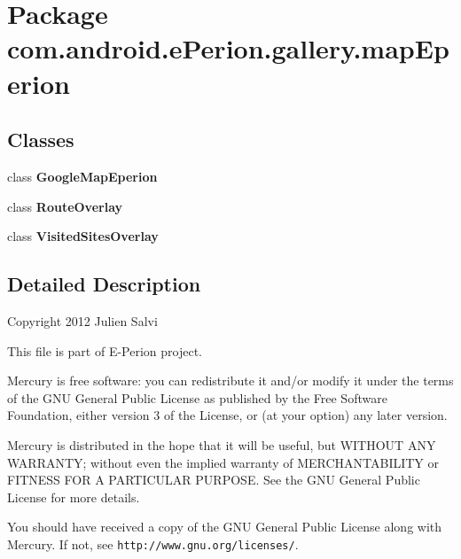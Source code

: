 \section{Package com.\-android.\-e\-Perion.\-gallery.\-map\-Eperion}
\label{namespacecom_1_1android_1_1e_perion_1_1gallery_1_1map_eperion}
\subsection*{Classes}
\begin{DoxyCompactItemize}
\item 
class {\bf Google\-Map\-Eperion}
\item 
class {\bf Route\-Overlay}
\item 
class {\bf Visited\-Sites\-Overlay}
\end{DoxyCompactItemize}


\subsection{Detailed Description}
Copyright 2012 Julien Salvi

This file is part of E-\/\-Perion project.

Mercury is free software\-: you can redistribute it and/or modify it under the terms of the G\-N\-U General Public License as published by the Free Software Foundation, either version 3 of the License, or (at your option) any later version.

Mercury is distributed in the hope that it will be useful, but W\-I\-T\-H\-O\-U\-T A\-N\-Y W\-A\-R\-R\-A\-N\-T\-Y; without even the implied warranty of M\-E\-R\-C\-H\-A\-N\-T\-A\-B\-I\-L\-I\-T\-Y or F\-I\-T\-N\-E\-S\-S F\-O\-R A P\-A\-R\-T\-I\-C\-U\-L\-A\-R P\-U\-R\-P\-O\-S\-E. See the G\-N\-U General Public License for more details.

You should have received a copy of the G\-N\-U General Public License along with Mercury. If not, see {\tt http\-://www.\-gnu.\-org/licenses/}. 